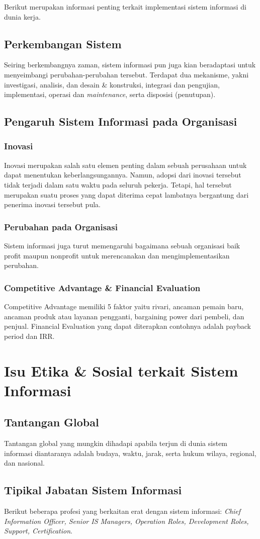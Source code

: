 \documentclass{article}
\begin{document}
\noindent Berikut merupakan informasi penting terkait implementasi sistem informasi di dunia kerja.

\subsection{Perkembangan Sistem}
Seiring berkembangnya zaman, sistem informasi pun juga kian beradaptasi untuk menyeimbangi perubahan-perubahan tersebut. Terdapat dua mekanisme, yakni investigasi, analisis, dan desain \& konstruksi, integrasi dan pengujian, implementasi, operasi dan \emph{maintenance}, serta disposisi (penutupan).

\subsection{Pengaruh Sistem Informasi pada Organisasi}
\subsubsection{Inovasi}
Inovasi merupakan salah satu elemen penting dalam sebuah perusahaan untuk dapat menentukan keberlangsungannya. Namun, adopsi dari inovasi tersebut tidak terjadi dalam satu waktu pada seluruh pekerja. Tetapi, hal tersebut merupakan suatu proses yang dapat diterima cepat lambatnya bergantung dari penerima inovasi tersebut pula.
\subsubsection{Perubahan pada Organisasi}
Sistem informasi juga turut memengaruhi bagaimana sebuah organisasi baik profit maupun nonprofit untuk merencanakan dan mengimplementasikan perubahan.
\subsubsection{Competitive Advantage \& Financial Evaluation}
Competitive Advantage memiliki 5 faktor yaitu rivari, ancaman pemain baru, ancaman produk atau layanan pengganti, bargaining power dari pembeli, dan penjual. Financial Evaluation yang dapat diterapkan contohnya adalah payback period dan IRR.

\section{Isu Etika \& Sosial terkait Sistem Informasi}
\subsection{Tantangan Global}
Tantangan global yang mungkin dihadapi apabila terjun di dunia sistem informasi diantaranya adalah budaya, waktu, jarak, serta hukum wilaya, regional, dan nasional.
\subsection{Tipikal Jabatan Sistem Informasi}
Berikut beberapa profesi yang berkaitan erat dengan sistem informasi: \emph{Chief Information Officer, Senior IS Managers, Operation Roles, Development Roles, Support, Certification}.
\end{document}
